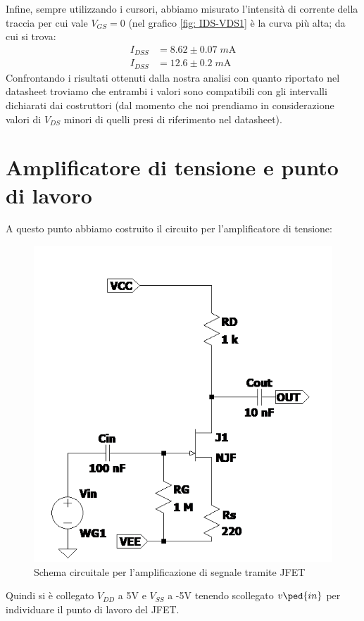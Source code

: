 \documentclass[10pt, a4paper, italian]{article}
\begin{document}
Infine, sempre utilizzando i cursori, abbiamo misurato l'intensità di corrente
della traccia per cui vale $V_{GS} = 0$ (nel grafico \ref{fig: IDS-VDS1} è
la curva più alta; da cui si trova:
\begin{align*}
I_{DSS} &= 8.62 \pm 0.07 \; \si{m\A} \\
I_{DSS} &= 12.6 \pm 0.2 \; \si{m\A}
\end{align*}
Confrontando i risultati ottenuti dalla nostra analisi con quanto riportato
nel datasheet troviamo che entrambi i valori sono compatibili con gli
intervalli dichiarati dai costruttori (dal momento che noi prendiamo in
considerazione valori di $V_{DS}$ minori di quelli presi di riferimento nel
datasheet).

\section{Amplificatore di tensione e punto di lavoro}
A questo punto abbiamo costruito il circuito per l'amplificatore di tensione:
\begin{figure}[htbp]
    \centering
	\includegraphics[scale=0.7]{Draft2}
    \caption{Schema circuitale per l'amplificazione di segnale tramite JFET}
\end{figure}
Quindi si è collegato $V_{DD}$ a 5V e $V_{SS}$ a -5V tenendo scollegato
$v\ped{in}$ per individuare il punto di lavoro del JFET.
\end{document}
